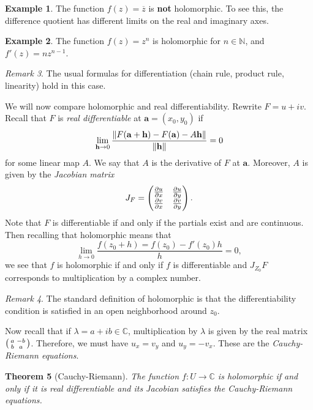 \documentclass[leqno, openany]{memoir}
\newtheorem{thm}{Theorem}[section]
\theoremstyle{definition}
\newtheorem{exm}[thm]{Example}
\theoremstyle{remark}
\newtheorem{rmk}[thm]{Remark}
\theoremstyle{plain}
\theoremstyle{definition}
\theoremstyle{remark}
\newcommand{\C}{\mathbb{C}}
\newcommand{\N}{\mathbb{N}}
\newcommand{\ol}[1]{\overline{#1}}
\begin{document}
\begin{exm}
    The function $f(z) = \ol{z}$ is \textbf{not} holomorphic. To see this, the difference quotient has different limits on the real and imaginary axes.
\end{exm}

\begin{exm}
    The function $f(z) = z^n$ is holomorphic for $n \in \N$, and $f'(z) = nz^{n-1}$.
\end{exm}

\begin{rmk}
    The usual formulas for differentiation (chain rule, product rule, linearity) hold in this case.
\end{rmk}

We will now compare holomorphic and real differentiability. Rewrite $F = u + iv$. Recall that $F$ is \textit{real differentiable} at $\mathbf{a} = (x_0,y_0)$ if 
\[ \lim_{\mathbf{h} \to 0} \frac{\norm{F(\mathbf{a} + \mathbf{h}) - F(\mathbf{a}) - A \mathbf{h}}}{\norm{\mathbf{h}}} = 0 \]
for some linear map $A$. We say that $A$ is the derivative of $F$ at $\mathbf{a}$. Moreover, $A$ is given by the \textit{Jacobian matrix}
\[ J_F = \begin{pmatrix}
    \pdv{u}{x} & \pdv{u}{y} \\
    \pdv{v}{x} & \pdv{v}{y}
\end{pmatrix}. \]
Note that $F$ is differentiable if and only if the partials exist and are continuous. Then recalling that holomorphic means that 
\[ \lim_{h \to 0} \frac{f(z_0 + h) = f(z_0) - f'(z_0)h}{h} = 0, \]
we see that $f$ is holomorphic if and only if $f$ is differentiable and $J_{Z_0} F$ corresponds to multiplication by a complex number.

\begin{rmk}
    The standard definition of holomorphic is that the differentiability condition is satisfied in an open neighborhood around $z_0$.
\end{rmk}

Now recall that if $\lambda = a+ib \in \C$, multiplication by $\lambda$ is given by the real matrix $\begin{psmallmatrix} a & -b \\ b & a \end{psmallmatrix}$. Therefore, we must have $u_x = v_y$ and $u_y = -v_x$. These are the \textit{Cauchy-Riemann equations}. 

\begin{thm}[Cauchy-Riemann]
    The function $f \colon U \to \C$ is holomorphic if and only if it is real differentiable and its Jacobian satisfies the Cauchy-Riemann equations.
\end{thm}
\end{document}
